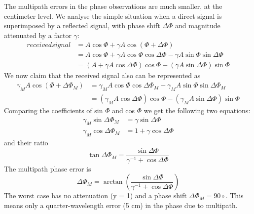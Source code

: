 		The multipath errors in the phase observations are much smaller, at the centimeter level. We analyse the simple situation when a direct signal is superimposed by a reflected signal, with phase shift $\Delta\Phi$ and magnitude attenuated by a factor $\gamma$:
		\begin{align*}
			received signal &= A\cos\Phi+\gamma A\cos(\Phi+\Delta\Phi) \\
								&= A\cos\Phi+\gamma A\cos\Phi\cos\Delta\Phi-\gamma A\sin\Phi\sin\Delta\Phi\\
								&= (A+\gamma A\cos\Delta\Phi)\cos\Phi-(\gamma A\sin\Delta\Phi)\sin\Phi
		\end{align*}
		We now claim that the received signal also can be represented as
		\begin{align*}
			\gamma_MA\cos(\Phi+\Delta\Phi_M) &= \gamma_MA\cos\Phi\cos\Delta\Phi_M-\gamma_MA\sin\Phi\sin\Delta\Phi_M \\
											 &= (\gamma_MA\cos\Delta\Phi)\cos\Phi-(\gamma_MA\sin\Delta\Phi)\sin\Phi
		\end{align*}
		Comparing the coefficients of sin $\Phi$ and cos $\Phi$ we get the following two equations:
		\begin{align*}
			\gamma_M\sin\Delta\Phi_M &=\gamma\sin\Delta\Phi \\
			\gamma_M\cos\Delta\Phi_M &=1+\gamma\cos\Delta\Phi
		\end{align*}
		and their ratio
		\begin{equation*}
			\tan \Delta\Phi_M=\dfrac{\sin\Delta\Phi}{\gamma^{-1}+\cos\Delta\Phi}
		\end{equation*}
		The multipath phase error is
		\begin{equation*}
			\Delta\Phi_M=\arctan(\dfrac{\sin\Delta\Phi}{\gamma^{-1}+\cos\Delta\Phi})
		\end{equation*}
		The worst case has no attenuation (y = 1) and a phase shift $\Delta\Phi_M=90\circ$. This means only a quarter-wavelength error (5 cm) in the phase due to multipath.
		
